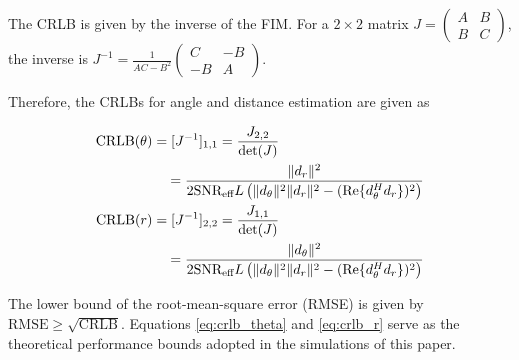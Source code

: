 \documentclass[lettersize,journal]{IEEEtran}
\begin{document}
{The CRLB is given by the inverse of the FIM. For a $2 \times 2$ matrix $J = \begin{pmatrix} A & B \\ B & C \end{pmatrix}$, the inverse is $J^{-1} = \frac{1}{AC-B^2} \begin{pmatrix} C & -B \\ -B & A \end{pmatrix}$.

Therefore, the CRLBs for angle and distance estimation are given as

\begin{align}
    \text{CRLB}(\theta) &= [J^{-1}]_{1,1} = \frac{J_{2,2}}{\det(J)} \notag \\  
    &\quad = \frac{\|d_r\|^2}{2 \text{SNR}_{\text{eff}} L \left( \|d_\theta\|^2 \|d_r\|^2 - (\text{Re}\{d_\theta^H d_r\})^2 \right)} \label{eq:crlb_theta} \\
    \text{CRLB}(r) &= [J^{-1}]_{2,2} = \frac{J_{1,1}}{\det(J)} \notag \\  
    &\quad = \frac{\|d_\theta\|^2}{2 \text{SNR}_{\text{eff}} L \left( \|d_\theta\|^2 \|d_r\|^2 - (\text{Re}\{d_\theta^H d_r\})^2 \right)} \label{eq:crlb_r}
\end{align}

The lower bound of the root-mean-square error (RMSE) is given by $\text{RMSE} \ge \sqrt{\text{CRLB}}$. Equations \eqref{eq:crlb_theta} and \eqref{eq:crlb_r} serve as the theoretical performance bounds adopted in the simulations of this paper.
}








\vfill
\end{document}

